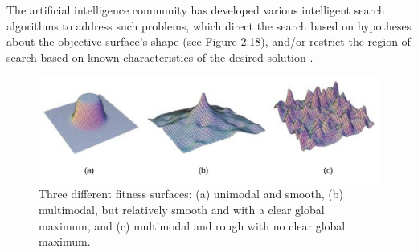\documentclass[12pt]{report} 	%
\numberwithin{figure}{chapter}
\numberwithin{table}{chapter}
\numberwithin{equation}{chapter}
\begin{document}
\begin{flushleft}
The artificial intelligence community has developed various intelligent search algorithms to address such problems, which direct the search based on hypotheses about the objective surface's shape (see Figure 2.18), and/or restrict the region of search based on known characteristics of the desired solution \cite[p. 64-108]{Russell:2009ai}.
\begin{figure}[h!]
\begin{center}
\includegraphics[scale=0.6]{DifferentTopologies}
\caption[Fitness surface topologies]{Three different fitness surfaces: (a) unimodal and smooth, (b) multimodal, but relatively smooth and with a clear global maximum, and (c) multimodal and rough with no clear global maximum.}
\end{center}
\end{figure}


\end{flushleft}
\end{document}
